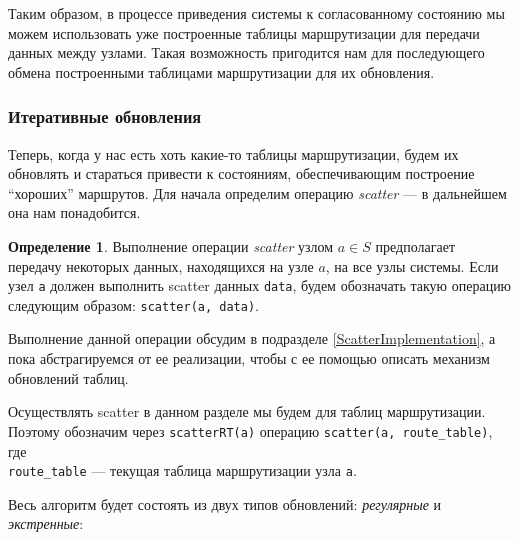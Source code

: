 \documentclass{article}
\theoremstyle{plain}
\theoremstyle{plain}
\theoremstyle{plain}
\theoremstyle{plain}
\theoremstyle{definition}
\newtheorem{definition}{Определение}[section]
\theoremstyle{remark}
\theoremstyle{plain}
\begin{document}
Таким образом, в процессе приведения системы к согласованному состоянию мы можем использовать уже построенные таблицы маршрутизации для передачи данных между узлами. Такая возможность пригодится нам для последующего обмена построенными таблицами маршрутизации для их обновления.

\subsubsection{Итеративные обновления}
\label{IterativeUpdates}

Теперь, когда у нас есть хоть какие-то таблицы маршрутизации, будем их обновлять и стараться привести к состояниям, обеспечивающим построение \enquote{хороших} маршрутов. Для начала определим операцию \textit{scatter} --- в дальнейшем она нам понадобится.

\begin{definition}
\label{ScatterDefinition}
    Выполнение операции \textit{scatter} узлом $a \in S$ предполагает передачу некоторых данных, находящихся на узле $a$, на все узлы системы. Если узел \texttt{a} должен выполнить scatter данных \texttt{data}, будем обозначать такую операцию следующим образом: \texttt{scatter(a, data)}.
\end{definition}

Выполнение данной операции обсудим в подразделе \ref{ScatterImplementation}, а пока абстрагируемся от ее реализации, чтобы с ее помощью описать механизм обновлений таблиц.

Осуществлять scatter в данном разделе мы будем для таблиц маршрутизации. Поэтому обозначим через \texttt{scatterRT(a)} операцию \texttt{scatter(a, route\_table)}, где \\
\texttt{route\_table} --- текущая таблица маршрутизации узла \texttt{a}.

Весь алгоритм будет состоять из двух типов обновлений: \textit{регулярные} и \textit{экстренные}:
\end{document}
